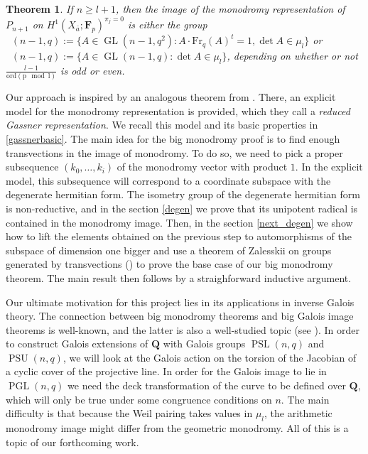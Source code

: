 \documentclass{article}
\newtheorem{theorem}{Theorem}
\theoremstyle{definition}
\DeclareMathOperator{\GL}{\mathrm{GL}}
\DeclareMathOperator{\PGL}{\mathrm{PGL}}
\DeclareMathOperator{\PSL}{\mathrm{PSL}}
\DeclareMathOperator{\SlU}{\mathrm{S}_{\mathit{l}}\mathrm{U}}
\DeclareMathOperator{\SlL}{\mathrm{S}_{\mathit{l}}\mathrm{L}}
\DeclareMathOperator{\PSU}{\mathrm{PSU}}
\begin{document}
	\begin{theorem} \label{main}
		If $n \geq l + 1$, then the image of the monodromy representation of $P_{n+1}$ on $H^1(X_{\bar{a}}; \mathbf{F}_p)^{\pi_j = 0}$ is either the group $\SlU(n-1,q) := \{A \in \GL(n-1,q^2) : A \cdot \mathrm{Fr}_q(A)^t = 1, \det A \in \mu_l \}$ or $\SlL(n-1,q) := \{A \in \GL(n-1,q) : \det A \in \mu_l\}$, depending on whether or not $\frac{l-1}{\mathrm{ord (p \mod l)}}$ is odd or even.
	\end{theorem}
	Our approach is inspired by an analogous theorem from \cite{cyclic}. There, an explicit model for the monodromy representation is provided, which they call a \emph{reduced Gassner representation}. We recall this model and its basic properties in \ref{gassnerbasic}. The main idea for the big monodromy proof is to find enough transvections in the image of monodromy. To do so, we need to pick a proper subsequence $(k_0, \ldots, k_i)$ of the monodromy vector with product $1$. In the explicit model, this subsequence will correspond to a coordinate subspace with the degenerate hermitian form. The isometry group of the degenerate hermitian form is non-reductive, and in the section \ref{degen} we prove that its unipotent radical is contained in the monodromy image. Then, in the section \ref{next_degen} we show how to lift the elements obtained on the previous step to automorphisms of the subspace of dimension one bigger and use a theorem of Zalesskii on groups generated by transvections (\cite{zalesskii}) to prove the base case of our big monodromy theorem. The main result then follows by a straighforward inductive argument. \par 
	Our ultimate motivation for this project lies in its applications in inverse Galois theory. The connection between big monodromy theorems and big Galois image theorems is well-known, and the latter is also a well-studied topic (see \cite{abvar}). In order to construct Galois extensions of $\mathbf{Q}$ with Galois groups $\PSL(n,q)$ and $\PSU(n,q)$, we will look at the Galois action on the torsion of the Jacobian of a cyclic cover of the projective line. In order for the Galois image to lie in $\PGL(n,q)$ we need the deck transformation of the curve to be defined over $\mathbf{Q}$, which will only be true under some congruence conditions on $n$. The main difficulty is that because the Weil pairing takes values in $\mu_l$, the arithmetic monodromy image might differ from the geometric monodromy. All of this is a topic of our forthcoming work.
\end{document}
